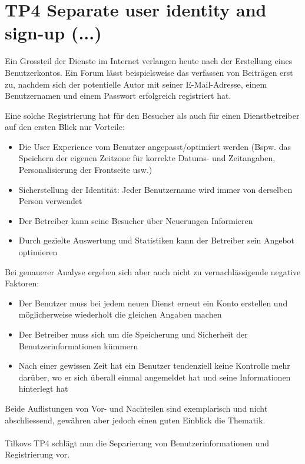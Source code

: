 \section{TP4 Separate user identity and sign-up (...)}
\label{sec:principle-tp4-seperate-user-identity}

Ein Grossteil der Dienste im Internet verlangen heute nach der Erstellung eines Benutzerkontos. Ein Forum lässt beispielsweise das verfassen von Beiträgen erst zu, nachdem sich der potentielle Autor mit seiner E-Mail-Adresse, einem Benutzernamen und einem Passwort erfolgreich registriert hat.

Eine solche Registrierung hat für den Besucher als auch für einen Dienstbetreiber auf den ersten Blick nur Vorteile:

\begin{itemize}
	\item Die User Experience vom Benutzer angepasst/optimiert werden (Bspw. das Speichern der eigenen Zeitzone für korrekte Datums- und Zeitangaben, Personalisierung der Frontseite usw.)
	\item Sicherstellung der Identität: Jeder Benutzername wird immer von derselben Person verwendet
	\item Der Betreiber kann seine Besucher über Neuerungen Informieren
	\item Durch gezielte Auswertung und Statistiken kann der Betreiber sein Angebot optimieren
\end{itemize}

Bei genauerer Analyse ergeben sich aber auch nicht zu vernachlässigende negative Faktoren:

\begin{itemize}
	\item Der Benutzer muss bei jedem neuen Dienst erneut ein Konto erstellen und möglicherweise wiederholt die gleichen Angaben machen
	\item Der Betreiber muss sich um die Speicherung und Sicherheit der Benutzerinformationen kümmern
	\item Nach einer gewissen Zeit hat ein Benutzer tendenziell keine Kontrolle mehr darüber, wo er sich überall einmal angemeldet hat und seine Informationen hinterlegt hat
\end{itemize}

Beide Auflistungen von Vor- und Nachteilen sind exemplarisch und nicht abschliessend, gewähren aber jedoch einen guten Einblick die Thematik.\\
\\
Tilkovs TP4 schlägt nun die Separierung von Benutzerinformationen und Registrierung vor.

